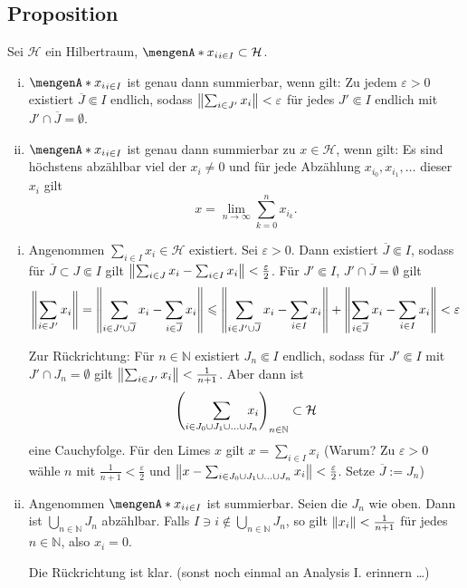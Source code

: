 \subsection{Proposition} %
\label{sub:717}
Sei $\mathcal{H}$ ein Hilbertraum, $\set{x_i}_{i \in I} \subset \mathcal{H}$. 
\begin{enumerate}[(i)]
	\item $\set{x_i}_{i \in I}$ ist genau dann summierbar, wenn gilt: Zu jedem $\varepsilon>0$ existiert $\overline{J} \Subset I$ endlich, sodass 
	$\norm{\sum_{i \in J'}x_i}< \varepsilon$ für jedes $J' \Subset I$ endlich mit $J' \cap \overline{J} = \emptyset$.
	\item $\set{x_i}_{i \in I}$ ist genau dann summierbar zu $x \in \mathcal{H}$, wenn gilt: Es sind höchstens abzählbar viel der $x_i \not=0$ und für jede Abzählung 
	$x_{i_0}, x_{i_1}, \ldots $ dieser $x_i$ gilt 
	\[
		x= \lim_{n \to \infty} \sum_{k=0}^{n} x_{i_k}.
	\]
\end{enumerate}
\begin{enumerate}[(i)]
	\item Angenommen $\sum_{i\in I} x_i \in \mathcal{H}$ existiert. Sei $\varepsilon>0$. Dann existiert $\overline{J}\Subset I$, sodass für $\overline{J}\subset J\Subset I$ 
	gilt $\norm{\sum_{i \in J} x_i - \sum_{i \in I} x_i} < \frac{\varepsilon}{2}$. Für $J' \Subset I$, $J' \cap \overline{J}=\emptyset$ gilt
	\begin{align*}
		\norm{\sum_{i \in J'} x_i} = \norm{\sum_{i \in J' \cup \overline{J}} x_i - \sum_{i \in \overline{J}} x_i}  \le \norm{\sum_{i \in J' \cup \overline{J}}x_i - \sum_{i \in I} x_i} + \norm{\sum_{i \in \overline{J}} x_i - \sum_{i \in I}x_i}< \varepsilon  
	\end{align*}
	
	Zur Rückrichtung: Für $n \in \mathds{N}$ existiert $J_n \Subset I$ endlich, sodass für $J' \Subset I$ mit $J' \cap J_n = \emptyset$ gilt 
	$\norm{\sum_{i \in J'} x_i}< \frac{1}{n+1}$. Aber dann ist 
	\begin{align*}
		\enbrace*{\sum_{i \in J_0 \cup J_1 \cup \ldots \cup J_n} \hspace{-1em} x_i}_{n \in \mathds{N}} \subset \mathcal{H}
	\end{align*}
	eine Cauchyfolge. Für den Limes $x$ gilt $x= \sum_{i \in I} x_i$ (Warum? Zu $\varepsilon>0$ wähle $n$ mit $\frac{1}{n+1}<\frac{\varepsilon}{2}$ und 
	$\norm{x - \sum_{i \in J_0 \cup J_1 \cup \ldots \cup J_n} x_i}< \frac{\varepsilon}{2}$. Setze $\overline{J}:= J_n$)
	\item Angenommen $\set{x_i}_{i \in I}$ ist summierbar. Seien die $J_n$ wie oben. Dann ist $\bigcup_{n \in \mathds{N}} J_n$ abzählbar. Falls 
	$I \ni i \not\in \bigcup_{n \in \mathds{N}} J_n$, so gilt $\norm{x_i} < \frac{1}{n+1}$ für jedes $n \in \mathds{N}$, also $x_i=0$.
	
	Die Rückrichtung ist klar. (sonst noch einmal an Analysis I. erinnern \ldots ) \bewende
\end{enumerate}

